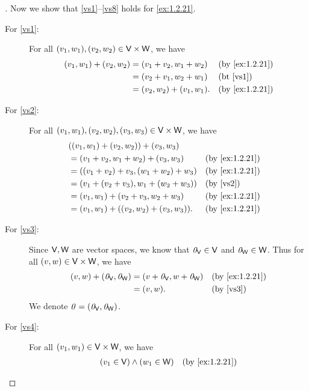 \begin{proof}[]
	Now we show that \ref{vs1}--\ref{vs8} holds for \cref{ex:1.2.21}.
	\begin{description}
		\item[For \ref{vs1}:]
			For all \((v_1, w_1), (v_2, w_2) \in \mathsf{V} \times \mathsf{W}\), we have
			\begin{align*}
				(v_1, w_1) + (v_2, w_2) & = (v_1 + v_2, w_1 + w_2)   &  & \text{(by \cref{ex:1.2.21})} \\
				                        & = (v_2 + v_1, w_2 + w_1)   &  & \text{(bt \ref{vs1})}        \\
				                        & = (v_2, w_2) + (v_1, w_1). &  & \text{(by \cref{ex:1.2.21})}
			\end{align*}
		\item[For \ref{vs2}:]
			For all \((v_1, w_1), (v_2, w_2), (v_3, w_3) \in \mathsf{V} \times \mathsf{W}\), we have
			\begin{align*}
				 & ((v_1, w_1) + (v_2, w_2)) + (v_3, w_3)                                      \\
				 & = (v_1 + v_2, w_1 + w_2) + (v_3, w_3)     &  & \text{(by \cref{ex:1.2.21})} \\
				 & = ((v_1 + v_2) + v_3, (w_1 + w_2) + w_3)  &  & \text{(by \cref{ex:1.2.21})} \\
				 & = (v_1 + (v_2 + v_3), w_1 + (w_2 + w_3))  &  & \text{(by \ref{vs2})}        \\
				 & = (v_1, w_1) + (v_2 + v_3, w_2 + w_3)     &  & \text{(by \cref{ex:1.2.21})} \\
				 & = (v_1, w_1) + ((v_2, w_2) + (v_3, w_3)). &  & \text{(by \cref{ex:1.2.21})}
			\end{align*}
		\item[For \ref{vs3}:]
			Since \(\mathsf{V}, \mathsf{W}\) are vector spaces, we know that \(\mathit{0}_{\mathsf{V}} \in \mathsf{V}\) and \(\mathit{0}_{\mathsf{W}} \in \mathsf{W}\).
			Thus for all \((v, w) \in \mathsf{V} \times \mathsf{W}\), we have
			\begin{align*}
				(v, w) + (\zv_{\V}, \zv_{\W}) & = (v + \zv_{\V}, w + \zv_{\W}) &  & \text{(by \cref{ex:1.2.21})} \\
				                              & = (v, w).                      &  & \text{(by \ref{vs3})}
			\end{align*}
			We denote \(\mathit{0} = (\mathit{0}_{\mathsf{V}}, \mathit{0}_{\mathsf{W}})\).
		\item[For \ref{vs4}:]
			For all \((v_1, w_1) \in \mathsf{V} \times \mathsf{W}\), we have
			\begin{align*}
				         & (v_1 \in \V) \land (w_1 \in \W)                                      &  & \text{(by \cref{ex:1.2.21})}  \\

\end{align*}
\end{description}
\end{proof}
